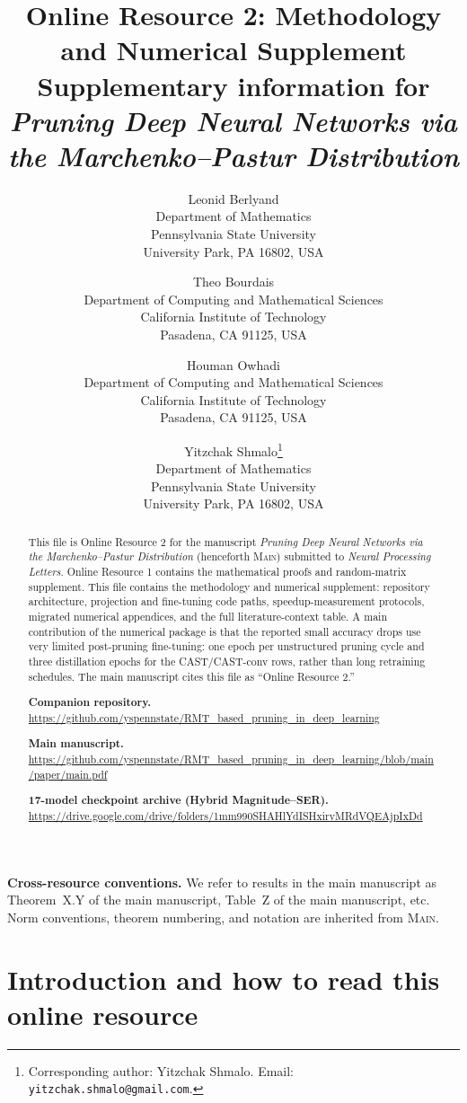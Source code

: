\documentclass[11pt]{article}
\title{\textbf{Online Resource 2: Methodology and Numerical Supplement}\\[4pt]
  \large Supplementary information for \emph{Pruning Deep Neural Networks via the Marchenko--Pastur Distribution}}
\author{
    Leonid Berlyand \\
    {\small Department of Mathematics} \\
    {\small Pennsylvania State University} \\
    {\small University Park, PA 16802, USA}
    \and
    Theo Bourdais\\
    {\small Department of Computing and Mathematical Sciences} \\
    {\small California Institute of Technology} \\
    {\small Pasadena, CA 91125, USA}
    \and
    Houman Owhadi\\
    {\small Department of Computing and Mathematical Sciences} \\
    {\small California Institute of Technology} \\
    {\small Pasadena, CA 91125, USA}
    \and
    Yitzchak Shmalo\thanks{Corresponding author: Yitzchak Shmalo. Email: \texttt{yitzchak.shmalo@gmail.com}.} \\
    {\small Department of Mathematics} \\
    {\small Pennsylvania State University} \\
    {\small University Park, PA 16802, USA}
}
\date{}
\theoremstyle{plain}
\theoremstyle{definition}
\theoremstyle{remark}
\newcommand{\1}{\mathbf{1}}
\newcommand{\mainpaper}{\textsc{Main}}
\begin{document}
\maketitle

\begin{abstract}
This file is Online Resource 2 for the manuscript \emph{Pruning Deep Neural Networks via the Marchenko--Pastur Distribution} (henceforth \mainpaper{}) submitted to \emph{Neural Processing Letters}. Online Resource 1 contains the mathematical proofs and random-matrix supplement. This file contains the methodology and numerical supplement: repository architecture, projection and fine-tuning code paths, speedup-measurement protocols, migrated numerical appendices, and the full literature-context table. A main contribution of the numerical package is that the reported small accuracy drops use very limited post-pruning fine-tuning: one epoch per unstructured pruning cycle and three distillation epochs for the CAST/CAST-conv rows, rather than long retraining schedules. The main manuscript cites this file as ``Online Resource 2.''

\medskip
\noindent\textbf{Companion repository.}\quad
\url{https://github.com/yspennstate/RMT_based_pruning_in_deep_learning}

\medskip
\noindent\textbf{Main manuscript.}\quad
\url{https://github.com/yspennstate/RMT_based_pruning_in_deep_learning/blob/main/paper/main.pdf}

\medskip
\noindent\textbf{17-model checkpoint archive (Hybrid Magnitude--SER).}\quad
\url{https://drive.google.com/drive/folders/1mm990SHAHlYdISHxirvMRdVQEAjpIxDd}
\end{abstract}

\noindent\textbf{Cross-resource conventions.}\quad
We refer to results in the main manuscript as Theorem~X.Y of the main manuscript, Table~Z of the main manuscript, etc.
Norm conventions, theorem numbering, and notation are inherited from \mainpaper{}.

\tableofcontents

\section{Introduction and how to read this online resource}
\label{sec:intro}
\end{document}
